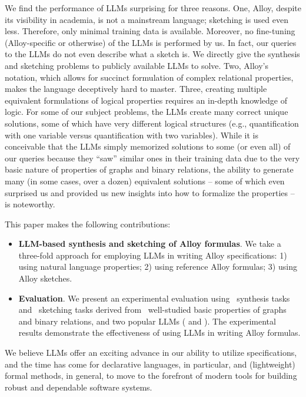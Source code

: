 We find the performance of LLMs surprising for three reasons.  One,
Alloy, despite its visibility in academia, is not a mainstream
language; sketching is used even less.  Therefore, only minimal
training data is available.  Moreover, no fine-tuning (Alloy-specific
or otherwise) of the LLMs is performed by us.  In fact, our queries to
the LLMs do not even describe what a sketch is.  We directly give the
synthesis and sketching problems to publicly available LLMs to solve.
Two, Alloy's notation, which allows for succinct formulation of
complex relational properties, makes the language deceptively hard to
master.  Three, creating multiple equivalent formulations of logical
properties requires an in-depth knowledge of logic.  For some of our
subject problems, the LLMs create many correct unique solutions, some
of which have very different logical structures (e.g., quantification
with one variable versus quantification with two variables).  While it
is conceivable that the LLMs simply memorized solutions to some (or
even all) of our queries because they ``saw'' similar ones in their
training data due to the very basic nature of properties of graphs and
binary relations, the ability to generate many (in some cases, over a
dozen) equivalent solutions -- some of which even surprised us and
provided us new insights into how to formalize the properties -- is
noteworthy.

This paper makes the following contributions:

\begin{itemize}
\item {\bf LLM-based synthesis and sketching of Alloy formulas}.  We
  take a three-fold approach for employing LLMs in writing Alloy
  specifications: 1) using natural language properties; 2) using
  reference Alloy formulas; 3) using Alloy sketches.
\item {\bf Evaluation}.  We present an experimental evaluation using
  \NumTotalSynthesis~synthesis tasks and \NumTotalSketching~sketching
  tasks derived from \NumSubjects~well-studied basic properties of
  graphs and binary relations, and two popular LLMs (\ChatGPTUsed{}
  and \DeepSeekUsed).  The experimental results demonstrate the
  effectiveness of using LLMs in writing Alloy formulas.
\end{itemize}
We believe LLMs offer an exciting advance in our ability to utilize
specifications, and the time has come for declarative languages, in
particular, and (lightweight) formal methods, in general, to move to
the forefront of modern tools for building robust and dependable
software systems.


